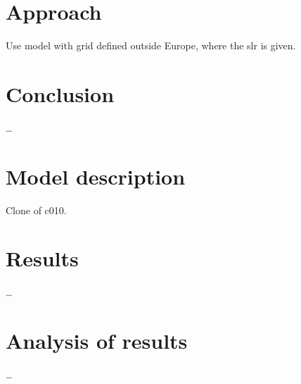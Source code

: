 \section*{Approach}
Use model with grid defined outside Europe, where the slr is given.

\section*{Conclusion}
\ldots

\section*{Model description}

Clone of c010.

\section*{Results}
\ldots

\section*{Analysis of results}
\ldots

\printrefsegment

